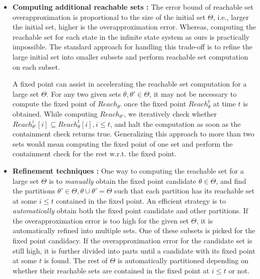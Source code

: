 \begin{itemize}[leftmargin=*]
\item \textbf{Computing additional reachable sets :} The error bound of reachable set overapproximation is proportional to the size of the initial set $\Theta$, i.e., larger the initial set, higher is the overapproximation error. 
%
Whereas, computing the reachable set for each state in the infinite state system as ours is practically impossible. 
%
The standard approach for handling this trade-off is to refine the large initial set into smaller subsets and perform reachable set computation on each subset.

A fixed point can assist in accelerating the reachable set computation for a large set $\Theta$. For any two given sets $\theta, \theta' \in \Theta$, it may not be necessary to compute the fixed point of $Reach_{\theta'}$ once the fixed point  $Reach_{\theta}^t$ at time $t$ is obtained. 
%
While computing $Reach_{\theta'}$, we iteratively check whether $Reach_{\theta'}^i[i] \subseteq Reach_{\theta}^t[i], i \leq t$, and halt the computation as soon as the containment check returns true. 
%
Generalizing this approach to more than two sets would mean computing the fixed point of one set and perform the containment check for the rest w.r.t. the fixed point.

\item \textbf{Refinement techniques :} One way to computing the   reachable set for a large set $\Theta$ is to \emph{manually} obtain the fixed point candidate $\theta \in \Theta$, and find the partitions $\theta' \in \Theta, \theta \cup \theta' = \Theta$ such that each partition has its reachable set at some $i \leq t$  contained in the fixed point. 
%
An efficient strategy is to \emph{automatically} obtain both the fixed point candidate and other partitions. If the overapproximation error is too high for the given set $\Theta$, it is automatically refined into multiple sets. 
%
One of these subsets is picked for the fixed point candidacy. If the overapproximation error for the candidate  set is still high, it is further divided into parts until a candidate with its fixed point at some $t$ is found. The rest of $\Theta$ is automatically partitioned depending on whether their reachable sets are contained in the fixed point at $i \leq t$ or not.
\end{itemize}

